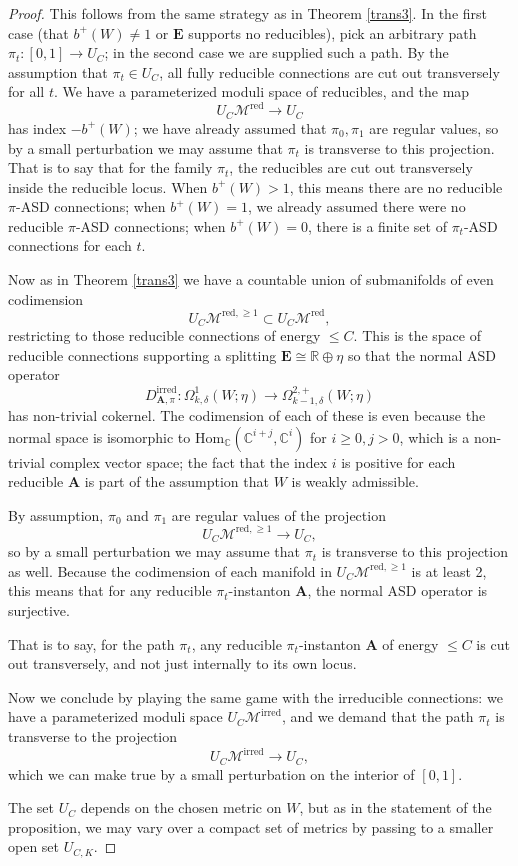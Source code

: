 \documentclass{memo-l}
\theoremstyle{definition}
\theoremstyle{remark}
\numberwithin{section}{chapter}
\numberwithin{equation}{chapter}
\begin{document}
\begin{proof}This follows from the same strategy as in Theorem \ref{trans3}. In the first case (that $b^+(W) \neq 1$ or $\mathbf{E}$ supports no reducibles), pick an arbitrary path $\pi_t: [0,1] \to U_C$; in the second case we are supplied such a path. By the assumption that $\pi_t \in U_C$, all fully reducible connections are cut out transversely for all $t$. We have a parameterized moduli space of reducibles, and the map
$$U_C \mathcal M^{\text{red}} \to U_C$$
has index $-b^+(W)$; we have already assumed that $\pi_0, \pi_1$ are regular values, so by a small perturbation we may assume that $\pi_t$ is transverse to this projection. That is to say that for the family $\pi_t$, the reducibles are cut out transversely inside the reducible locus. When $b^+(W) > 1$, this means there are no reducible $\pi$-ASD connections; when $b^+(W) = 1$, we already assumed there were no reducible $\pi$-ASD connections; when $b^+(W) = 0$, there is a finite set of $\pi_t$-ASD connections for each $t$.

Now as in Theorem \ref{trans3} we have a countable union of submanifolds of even codimension
$$U_C\mathcal M^{\text{red},\geq 1} \subset U_C \mathcal M^{\text{red}},$$
restricting to those reducible connections of energy $\leq C$. This is the space of reducible connections supporting a splitting $\mathbf{E} \cong \mathbb R \oplus \eta$ so that the normal ASD operator
$$D^{\text{irred}}_{\mathbf{A},\pi}: \Omega^1_{k,\delta}(W;\eta) \to \Omega^{2,+}_{k-1,\delta}(W;\eta)$$
has non-trivial cokernel. The codimension of each of these is even because the normal space is isomorphic to $\text{Hom}_{\mathbb C}(\mathbb C^{i+j}, \mathbb C^i)$ for $i \geq 0, j > 0$, which is a non-trivial complex vector space; the fact that the index $i$ is positive for each reducible $\mathbf{A}$ is part of the assumption that $W$ is weakly admissible.

By assumption, $\pi_0$ and $\pi_1$ are regular values of the projection
$$U_C\mathcal M^{\text{red},\geq 1} \to U_C,$$
so by a small perturbation we may assume that $\pi_t$ is transverse to this projection as well. Because the codimension of each manifold in $U_C\mathcal M^{\text{red},\geq 1}$ is at least 2, this means that for any reducible $\pi_t$-instanton $\mathbf{A}$, the normal ASD operator is surjective.

That is to say, for the path $\pi_t$, any reducible $\pi_t$-instanton $\mathbf{A}$ of energy $\leq C$ is cut out transversely, and not just internally to its own locus.

Now we conclude by playing the same game with the irreducible connections: we have a parameterized moduli space $U_C \mathcal M^{\text{irred}}$, and we demand that the path $\pi_t$ is transverse to the projection
$$U_C \mathcal M^{\text{irred}} \to U_C,$$
which we can make true by a small perturbation on the interior of $[0,1]$.

The set $U_C$ depends on the chosen metric on $W$, but as in the statement of the proposition, we may vary over a compact set of metrics by passing to a smaller open set $U_{C,K}$.
\end{proof}
\end{document}
